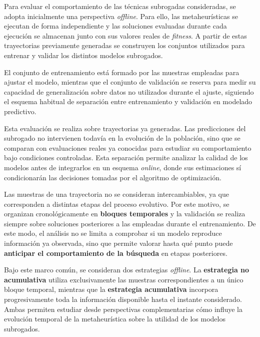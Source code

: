 

Para evaluar el comportamiento de las técnicas subrogadas consideradas, se adopta inicialmente una perspectiva \textit{offline}. Para ello, las metaheurísticas se ejecutan de forma independiente y las soluciones evaluadas durante cada ejecución se almacenan junto con sus valores reales de \textit{fitness}. A partir de estas trayectorias previamente generadas se construyen los conjuntos utilizados para entrenar y validar los distintos modelos subrogados.

El conjunto de entrenamiento está formado por las muestras empleadas para ajustar el modelo, mientras que el conjunto de validación se reserva para medir su capacidad de generalización sobre datos no utilizados durante el ajuste, siguiendo el esquema habitual de separación entre entrenamiento y validación en modelado predictivo.

Esta evaluación se realiza sobre trayectorias ya generadas. Las predicciones del subrogado no intervienen todavía en la evolución de la población, sino que se comparan con evaluaciones reales ya conocidas para estudiar su comportamiento bajo condiciones controladas. Esta separación permite analizar la calidad de los modelos antes de integrarlos en un esquema \textit{online}, donde sus estimaciones sí condicionarán las decisiones tomadas por el algoritmo de optimización.

Las muestras de una trayectoria no se consideran intercambiables, ya que corresponden a distintas etapas del proceso evolutivo. Por este motivo, se organizan cronológicamente en \textbf{bloques temporales} y la validación se realiza siempre sobre soluciones posteriores a las empleadas durante el entrenamiento. De este modo, el análisis no se limita a comprobar si un modelo reproduce información ya observada, sino que permite valorar hasta qué punto puede \textbf{anticipar el comportamiento de la búsqueda} en etapas posteriores.

Bajo este marco común, se consideran dos estrategias \textit{offline}. La \textbf{estrategia no acumulativa} utiliza exclusivamente las muestras correspondientes a un único bloque temporal, mientras que la \textbf{estrategia acumulativa} incorpora progresivamente toda la información disponible hasta el instante considerado. Ambas permiten estudiar desde perspectivas complementarias cómo influye la evolución temporal de la metaheurística sobre la utilidad de los modelos subrogados.

